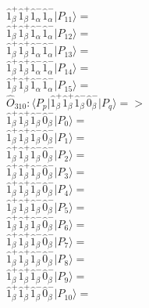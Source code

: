 \documentclass[14pt]{article}
\begin{document}
    $ \hat{1}_{\beta}^{+}\hat{1}_{\beta}^{+}\hat{1}_{\alpha}^{-}\hat{1}_{\alpha}^{-} \vert{P_{11}}\rangle =  $ \\ 
    $ \hat{1}_{\beta}^{+}\hat{1}_{\beta}^{+}\hat{1}_{\alpha}^{-}\hat{1}_{\alpha}^{-} \vert{P_{12}}\rangle =  $ \\ 
    $ \hat{1}_{\beta}^{+}\hat{1}_{\beta}^{+}\hat{1}_{\alpha}^{-}\hat{1}_{\alpha}^{-} \vert{P_{13}}\rangle =  $ \\ 
    $ \hat{1}_{\beta}^{+}\hat{1}_{\beta}^{+}\hat{1}_{\alpha}^{-}\hat{1}_{\alpha}^{-} \vert{P_{14}}\rangle =  $ \\ 
    $ \hat{1}_{\beta}^{+}\hat{1}_{\beta}^{+}\hat{1}_{\alpha}^{-}\hat{1}_{\alpha}^{-} \vert{P_{15}}\rangle =  $ \\ 
    
    $\hat{O}_{310}:  \langle{P_p}\vert \hat{1}_{\beta}^{+}\hat{1}_{\beta}^{+}\hat{1}_{\beta}^{-}\hat{0}_{\beta}^{-} \vert{P_q}\rangle => $ \\ 
    $ \hat{1}_{\beta}^{+}\hat{1}_{\beta}^{+}\hat{1}_{\beta}^{-}\hat{0}_{\beta}^{-} \vert{P_{0}}\rangle =  $ \\ 
    $ \hat{1}_{\beta}^{+}\hat{1}_{\beta}^{+}\hat{1}_{\beta}^{-}\hat{0}_{\beta}^{-} \vert{P_{1}}\rangle =  $ \\ 
    $ \hat{1}_{\beta}^{+}\hat{1}_{\beta}^{+}\hat{1}_{\beta}^{-}\hat{0}_{\beta}^{-} \vert{P_{2}}\rangle =  $ \\ 
    $ \hat{1}_{\beta}^{+}\hat{1}_{\beta}^{+}\hat{1}_{\beta}^{-}\hat{0}_{\beta}^{-} \vert{P_{3}}\rangle =  $ \\ 
    $ \hat{1}_{\beta}^{+}\hat{1}_{\beta}^{+}\hat{1}_{\beta}^{-}\hat{0}_{\beta}^{-} \vert{P_{4}}\rangle =  $ \\ 
    $ \hat{1}_{\beta}^{+}\hat{1}_{\beta}^{+}\hat{1}_{\beta}^{-}\hat{0}_{\beta}^{-} \vert{P_{5}}\rangle =  $ \\ 
    $ \hat{1}_{\beta}^{+}\hat{1}_{\beta}^{+}\hat{1}_{\beta}^{-}\hat{0}_{\beta}^{-} \vert{P_{6}}\rangle =  $ \\ 
    $ \hat{1}_{\beta}^{+}\hat{1}_{\beta}^{+}\hat{1}_{\beta}^{-}\hat{0}_{\beta}^{-} \vert{P_{7}}\rangle =  $ \\ 
    $ \hat{1}_{\beta}^{+}\hat{1}_{\beta}^{+}\hat{1}_{\beta}^{-}\hat{0}_{\beta}^{-} \vert{P_{8}}\rangle =  $ \\ 
    $ \hat{1}_{\beta}^{+}\hat{1}_{\beta}^{+}\hat{1}_{\beta}^{-}\hat{0}_{\beta}^{-} \vert{P_{9}}\rangle =  $ \\ 
    $ \hat{1}_{\beta}^{+}\hat{1}_{\beta}^{+}\hat{1}_{\beta}^{-}\hat{0}_{\beta}^{-} \vert{P_{10}}\rangle =  $ \\ 
\end{document}
